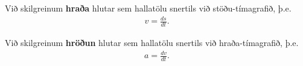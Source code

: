 \begin{tcolorbox}
\begin{definition}
Við skilgreinum \textbf{hraða} hlutar sem hallatölu snertils við stöðu-tímagrafið, þ.e.~
\begin{align*}
    v = \frac{ds}{dt}.
\end{align*}
\end{definition}
\end{tcolorbox}
\begin{tcolorbox}
\begin{definition}
Við skilgreinum \textbf{hröðun} hlutar sem hallatölu snertils við hraða-tímagrafið, þ.e.~
\begin{align*}
    a = \frac{dv}{dt}.
\end{align*}
\end{definition}
\end{tcolorbox}

